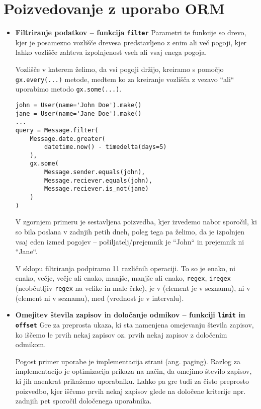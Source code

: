 \documentclass[a4paper,12pt,openright]{book}
\begin{document}
    \section{Poizvedovanje z uporabo ORM}
    \begin{itemize}
        \item \textbf{Filtriranje podatkov – funkcija {\tt filter}}
        \newline
        \noindent
        Parametri te funkcije so drevo, kjer je posamezno vozlišče drevesa predstavljeno z enim ali več pogoji, kjer lahko vozlišče zahteva izpolnjenost vseh ali vsaj enega pogoja.
        
        Vozlišče v katerem želimo, da vsi pogoji držijo, kreiramo s pomočjo {\tt gx.every(...)} metode, medtem ko za kreiranje vozlišča z vezavo ``ali`` uporabimo metodo {\tt gx.some(...)}.
        
\begin{verbatim}
john = User(name='John Doe').make()
jane = User(name='Jane Doe').make()
...
query = Message.filter(
    Message.date.greater(
        datetime.now() - timedelta(days=5)
    ),
    gx.some(
        Message.sender.equals(john),
        Message.reciever.equals(john),
        Message.reciever.is_not(jane)
    )
)
\end{verbatim}    

        \noindent
        V zgornjem primeru je sestavljena poizvedba, kjer izvedemo nabor sporočil, ki so bila poslana v zadnjih petih dneh, poleg tega pa želimo, da je izpolnjen vsaj eden izmed pogojev – pošiljatelj/prejemnik je ``John`` in prejemnik ni ``Jane``.

        V sklopu filtriranja podpiramo 11 različnih operaciji. To so je enako, ni enako, večje, večje ali enako, manjše, manjše ali enako, {\tt regex}, {\tt iregex} (neobčutljiv {\tt regex} na velike in male črke), je v (element je v seznamu), ni v (element ni v seznamu), med (vrednost je v intervalu).
        
        \item \textbf{Omejitev števila zapisov in določanje odmikov – funkciji {\tt limit} in {\tt offset}}
        \newline
        \noindent
        Gre za preprosta ukaza, ki sta namenjena omejevanju števila zapisov, ko iščemo le prvih nekaj zapisov oz. prvih nekaj zapisov z določenim odmikom. 

        Pogost primer uporabe je implementacija strani (ang. paging). Razlog za implementacijo je optimizacija prikaza na način, da omejimo število zapisov, ki jih naenkrat prikažemo uporabniku. Lahko pa gre tudi za čisto preprosto poizvedbo, kjer iščemo prvih nekaj zapisov glede na določene kriterije npr. zadnjih pet sporočil določenega uporabnika.
        

\end{itemize}
\end{document}
